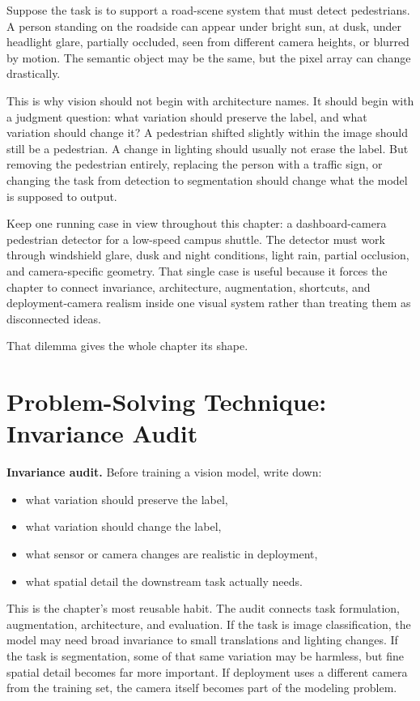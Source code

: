 Suppose the task is to support a road-scene system that must detect pedestrians. A person standing on the roadside can appear under bright sun, at dusk, under headlight glare, partially occluded, seen from different camera heights, or blurred by motion. The semantic object may be the same, but the pixel array can change drastically.

This is why vision should not begin with architecture names. It should begin with a judgment question: what variation should preserve the label, and what variation should change it? A pedestrian shifted slightly within the image should still be a pedestrian. A change in lighting should usually not erase the label. But removing the pedestrian entirely, replacing the person with a traffic sign, or changing the task from detection to segmentation should change what the model is supposed to output.

Keep one running case in view throughout this chapter: a dashboard-camera pedestrian detector for a low-speed campus shuttle. The detector must work through windshield glare, dusk and night conditions, light rain, partial occlusion, and camera-specific geometry. That single case is useful because it forces the chapter to connect invariance, architecture, augmentation, shortcuts, and deployment-camera realism inside one visual system rather than treating them as disconnected ideas.

That dilemma gives the whole chapter its shape.

\section{Problem-Solving Technique: Invariance Audit}

\begin{thinkingtool}
\textbf{Invariance audit.} Before training a vision model, write down:
\begin{itemize}[leftmargin=*]
\item what variation should preserve the label,
\item what variation should change the label,
\item what sensor or camera changes are realistic in deployment,
\item what spatial detail the downstream task actually needs.
\end{itemize}
\end{thinkingtool}

This is the chapter's most reusable habit. The audit connects task formulation, augmentation, architecture, and evaluation. If the task is image classification, the model may need broad invariance to small translations and lighting changes. If the task is segmentation, some of that same variation may be harmless, but fine spatial detail becomes far more important. If deployment uses a different camera from the training set, the camera itself becomes part of the modeling problem.

